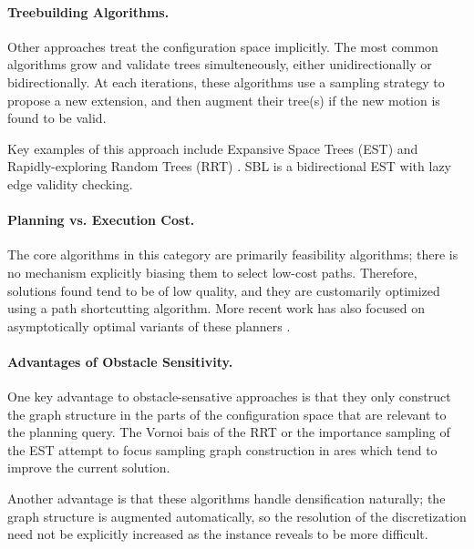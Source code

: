 \paragraph{Treebuilding Algorithms.}
Other approaches treat the configuration space implicitly.
The most common algorithms grow and validate trees simulteneously,
either unidirectionally or bidirectionally.
At each iterations,
these algorithms use a sampling strategy to propose a new extension,
and then augment their tree(s) if the new motion is found to be valid.

Key examples of this approach include
Expansive Space Trees (EST) \citep{hsu1997expansive}
and Rapidly-exploring Random Trees (RRT)
\citep{lavalle1998rrt, kuffner2000rrtconnect}.
SBL \citep{sanchezante2001sbl}
is a bidirectional EST with lazy edge validity checking.

\paragraph{Planning vs. Execution Cost.}
The core algorithms in this category are primarily feasibility
algorithms;
there is no mechanism explicitly biasing them to select
low-cost paths.
Therefore, solutions found tend to be of low quality,
and they are customarily optimized using a path shortcutting
algorithm.
More recent work has also focused on asymptotically optimal variants
of these planners \citep{karaman2010rrtstar}.

\paragraph{Advantages of Obstacle Sensitivity.}
One key advantage to obstacle-sensative approaches is that
they only construct the graph structure in the parts of the
configuration space that are relevant to the planning query.
The Vornoi bais of the RRT or the importance sampling of the EST
attempt to focus sampling graph construction in ares
which tend to improve the current solution.

Another advantage is that these algorithms handle densification
naturally;
the graph structure is augmented automatically,
so the resolution of the discretization need not be explicitly
increased as the instance reveals to be more difficult.




